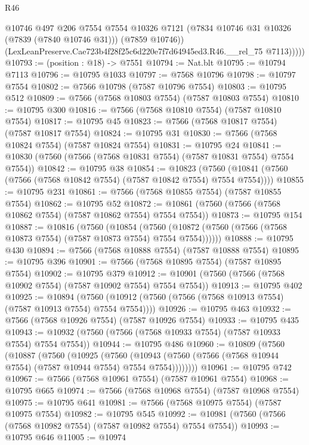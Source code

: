 \begin{lexlean}{R46}
\begin{coremodule}
              @10746
              @497
              @206
              @7554
              @7554
              @10326
              @7121
              (@7834 @10746 @31 @10326 (@7839 (@7840 @10746 @31)))
              (@7859 @10746))
            (LexLeanPreserve.Cae723b4f28f25c6d220e7f7d64945ed3.R46.__rel_75 @7113)))))
@10793 := (position : @18) -> @7551
@10794 := Nat.blt
@10795 := @10794 @7113
@10796 := @10795 @1033
@10797 := @7568 @10796
@10798 := @10797 @7554
@10802 := @7566 @10798 (@7587 @10796 @7554)
@10803 := @10795 @512
@10809 := @7566 (@7568 @10803 @7554) (@7587 @10803 @7554)
@10810 := @10795 @300
@10816 := @7566 (@7568 @10810 @7554) (@7587 @10810 @7554)
@10817 := @10795 @45
@10823 := @7566 (@7568 @10817 @7554) (@7587 @10817 @7554)
@10824 := @10795 @31
@10830 := @7566 (@7568 @10824 @7554) (@7587 @10824 @7554)
@10831 := @10795 @24
@10841 := @10830 (@7560 (@7566 (@7568 @10831 @7554) (@7587 @10831 @7554) @7554 @7554))
@10842 := @10795 @38
@10854 := @10823
    (@7560 (@10841 (@7560 (@7566 (@7568 @10842 @7554) (@7587 @10842 @7554) @7554 @7554))))
@10855 := @10795 @231
@10861 := @7566 (@7568 @10855 @7554) (@7587 @10855 @7554)
@10862 := @10795 @52
@10872 := @10861 (@7560 (@7566 (@7568 @10862 @7554) (@7587 @10862 @7554) @7554 @7554))
@10873 := @10795 @154
@10887 := @10816
    (@7560
      (@10854
        (@7560 (@10872 (@7560 (@7566 (@7568 @10873 @7554) (@7587 @10873 @7554) @7554 @7554))))))
@10888 := @10795 @430
@10894 := @7566 (@7568 @10888 @7554) (@7587 @10888 @7554)
@10895 := @10795 @396
@10901 := @7566 (@7568 @10895 @7554) (@7587 @10895 @7554)
@10902 := @10795 @379
@10912 := @10901 (@7560 (@7566 (@7568 @10902 @7554) (@7587 @10902 @7554) @7554 @7554))
@10913 := @10795 @402
@10925 := @10894
    (@7560 (@10912 (@7560 (@7566 (@7568 @10913 @7554) (@7587 @10913 @7554) @7554 @7554))))
@10926 := @10795 @463
@10932 := @7566 (@7568 @10926 @7554) (@7587 @10926 @7554)
@10933 := @10795 @435
@10943 := @10932 (@7560 (@7566 (@7568 @10933 @7554) (@7587 @10933 @7554) @7554 @7554))
@10944 := @10795 @486
@10960 := @10809
    (@7560
      (@10887
        (@7560
          (@10925
            (@7560
              (@10943 (@7560 (@7566 (@7568 @10944 @7554) (@7587 @10944 @7554) @7554 @7554))))))))
@10961 := @10795 @742
@10967 := @7566 (@7568 @10961 @7554) (@7587 @10961 @7554)
@10968 := @10795 @665
@10974 := @7566 (@7568 @10968 @7554) (@7587 @10968 @7554)
@10975 := @10795 @641
@10981 := @7566 (@7568 @10975 @7554) (@7587 @10975 @7554)
@10982 := @10795 @545
@10992 := @10981 (@7560 (@7566 (@7568 @10982 @7554) (@7587 @10982 @7554) @7554 @7554))
@10993 := @10795 @646
@11005 := @10974

\end{coremodule}
\end{lexlean}
